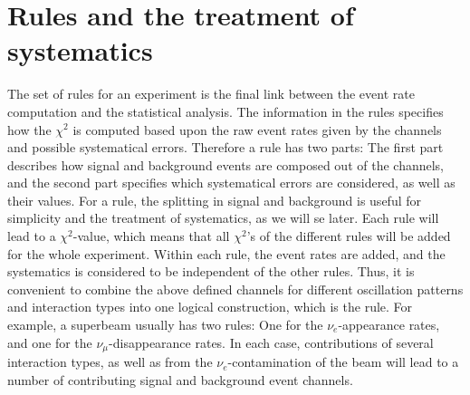 \section{Rules and the treatment of systematics}
\label{sec:rules}

The set of rules for an experiment is the final 
link between the event rate computation and the statistical analysis. 
The information in the rules
specifies how the $\chi^2$ is computed based upon the raw event rates 
given by the channels and possible systematical errors. 
Therefore a rule has two parts: The first part describes how signal and 
background events are composed out of the channels, and the second part
specifies which systematical errors are considered, as well as their values.
%
For a rule, the splitting
in signal and background is useful for simplicity and the treatment of systematics, as we will se later. Each rule will lead to a $\chi^2$-value,
which means that all $\chi^2$'s of the different rules will be added
for the whole experiment. Within each rule, the event rates are added, and
the systematics is considered to be independent of the other rules.
Thus, it is convenient to combine the above defined channels for different
oscillation patterns and interaction types into one logical construction,
which is the rule. For example, a superbeam usually has two rules: One for
the $\nu_e$-appearance rates, and one for the $\nu_\mu$-disappearance rates.
 In each case, contributions of several interaction types, as well as from
 the $\nu_e$-contamination of the beam will lead to a number of contributing signal and background event channels.


